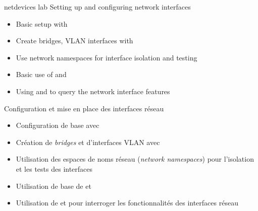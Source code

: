 {netdevices}
{lab}
{Setting up and configuring network interfaces}
{
  \begin{itemize}
  \item Basic setup with 
  \item Create bridges, VLAN interfaces with 
  \item Use network namespaces for interface isolation and testing
  \item Basic use of  and 
  \item Using  and  to query the network
    interface features
  \end{itemize}
}
{Configuration et mise en place des interfaces réseau}
{
  \begin{itemize}
  \item Configuration de base avec 
  \item Création de {\em bridges} et d'interfaces VLAN avec 
  \item Utilisation des espaces de noms réseau ({\em network namespaces}) pour l'isolation et les tests des interfaces
  \item Utilisation de base de  et 
  \item Utilisation de  et  pour interroger les fonctionnalités des interfaces réseau
  \end{itemize}
}

